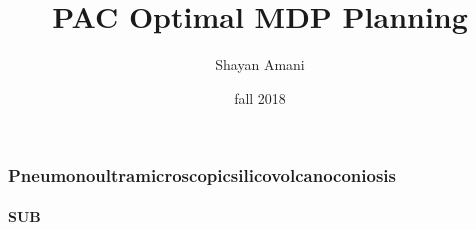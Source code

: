 \documentclass{beamer}
\title{PAC Optimal MDP Planning}
\author{Shayan Amani}
\date{fall 2018}
\institute{Department of Computer Science, University of New Hampshire}
\begin{document}
  \begin{frame}
    \titlepage
  \end{frame}

\begin{frame}
    \frametitle{Pneumonoultramicroscopicsilicovolcanoconiosis}
    \framesubtitle{SUB}

  \end{frame}

\end{document}
